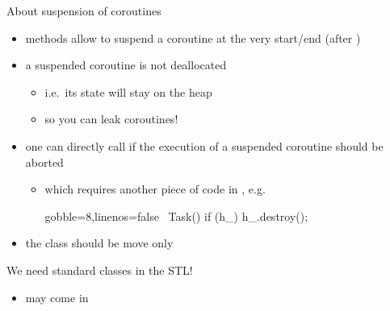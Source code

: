 \begin{frame}[fragile]
  \begin{block}{About suspension of coroutines}
    \begin{itemize}
    \item {} methods allow to suspend a coroutine at the very start/end (after )
    \item a suspended coroutine is not deallocated
      \begin{itemize}
      \item i.e.\ its state will stay on the heap
      \item so you can leak coroutines!
      \end{itemize}
    \item one can directly call  if the execution of a suspended coroutine should be aborted
      \begin{itemize}
      \item which requires another piece of code in , e.g.
        {\scriptsize
          \begin{cppcode*}{gobble=8,linenos=false}
            ~Task() { if (h_) h_.destroy(); }
          \end{cppcode*}
        }
      \end{itemize}
    \item the  class should be move only
     \end{itemize}
  \end{block}
  \begin{alertblock}{We need standard  classes in the STL!}
    \begin{itemize}
    \item {} may come in 
     \end{itemize}
    \end{alertblock}
\end{frame}

